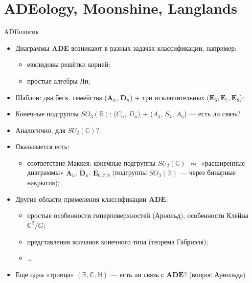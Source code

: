 \documentclass[serif, aspectratio=169]{beamer}
\begin{document}
\section{ADEology, Moonshine, Langlands}

\begin{frame}{ADEология}
    \begin{itemize}
        \item Диаграммы $\mathbf{ADE}$ возникают в разных задачах классификации, например:
        \begin{itemize}
            \item евклидовы решётки корней;
            \item простые алгебры Ли;
        \end{itemize}
        \item Шаблон: два беск. семейства ($\mathbf{A}_n$, $\mathbf{D}_n$) + три исключительных ($\mathbf{E}_6,\mathbf{E}_7,\mathbf{E}_8$);
        \item Конечные подгруппы $SO_3(\mathbb{R})$:
        ($C_n$, $D_n$) + ($A_4$, $S_4$, $A_5$) --- есть ли связь?
        \item Аналогично, для $SU_2(\mathbb{C})$?
        \item Оказывается есть:
        \begin{itemize}[<.->]
            \item соответствие Маккея: конечные подгруппы $SU_2(\mathbb{C})$ $\leftrightsquigarrow$ «расширенные диаграммы» $\tilde{\mathbf{A}}_n$, $\tilde{\mathbf{D}}_n$, $\tilde{\mathbf{E}}_{6,7,8}$ (подгруппы $SO_3(\mathbb{R})$ --- через бинарные накрытия);
        \end{itemize}
        \item Другие области применения классификации $\mathbf{ADE}$:
        \begin{itemize}[<.->]
            \item простые особенности гиперповерхностей (Арнольд), особенности Клейна $\mathbb{C}^2/G$;
            \item представления колчанов конечного типа (теорема Габриэля);
            \item \dots
        \end{itemize}
        \item Еще одна «троица» $(\mathbb{R},\mathbb{C},\mathbb{H})$ --- есть ли связь с $\mathbf{ADE}$? (вопрос Арнольда)
    \end{itemize}

\end{frame}
\end{document}

